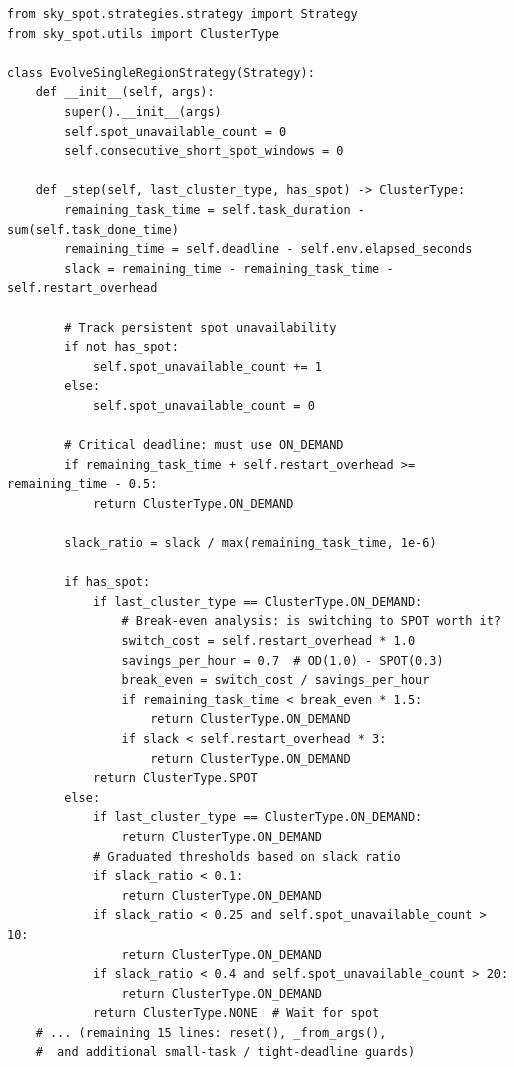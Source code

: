 \documentclass[sigconf,anonymous,review]{acmart}
\begin{document}
\begin{promptbox}
\begin{lstlisting}[aboveskip=0pt,belowskip=0pt,numbers=none,frame=none,backgroundcolor=\color{gray!5}]
from sky_spot.strategies.strategy import Strategy
from sky_spot.utils import ClusterType

class EvolveSingleRegionStrategy(Strategy):
    def __init__(self, args):
        super().__init__(args)
        self.spot_unavailable_count = 0
        self.consecutive_short_spot_windows = 0

    def _step(self, last_cluster_type, has_spot) -> ClusterType:
        remaining_task_time = self.task_duration - sum(self.task_done_time)
        remaining_time = self.deadline - self.env.elapsed_seconds
        slack = remaining_time - remaining_task_time - self.restart_overhead

        # Track persistent spot unavailability
        if not has_spot:
            self.spot_unavailable_count += 1
        else:
            self.spot_unavailable_count = 0

        # Critical deadline: must use ON_DEMAND
        if remaining_task_time + self.restart_overhead >= remaining_time - 0.5:
            return ClusterType.ON_DEMAND

        slack_ratio = slack / max(remaining_task_time, 1e-6)

        if has_spot:
            if last_cluster_type == ClusterType.ON_DEMAND:
                # Break-even analysis: is switching to SPOT worth it?
                switch_cost = self.restart_overhead * 1.0
                savings_per_hour = 0.7  # OD(1.0) - SPOT(0.3)
                break_even = switch_cost / savings_per_hour
                if remaining_task_time < break_even * 1.5:
                    return ClusterType.ON_DEMAND
                if slack < self.restart_overhead * 3:
                    return ClusterType.ON_DEMAND
            return ClusterType.SPOT
        else:
            if last_cluster_type == ClusterType.ON_DEMAND:
                return ClusterType.ON_DEMAND
            # Graduated thresholds based on slack ratio
            if slack_ratio < 0.1:
                return ClusterType.ON_DEMAND
            if slack_ratio < 0.25 and self.spot_unavailable_count > 10:
                return ClusterType.ON_DEMAND
            if slack_ratio < 0.4 and self.spot_unavailable_count > 20:
                return ClusterType.ON_DEMAND
            return ClusterType.NONE  # Wait for spot
    # ... (remaining 15 lines: reset(), _from_args(),
    #  and additional small-task / tight-deadline guards)
\end{lstlisting}
\end{promptbox}
\end{document}
